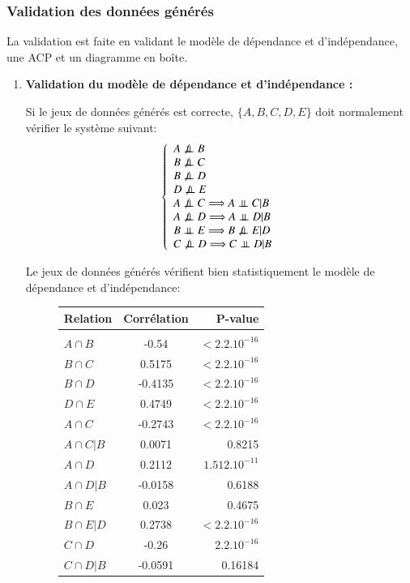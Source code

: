 \documentclass[a4paper]{article}
\begin{document}
\subsubsection{Validation des données générés}
La validation est faite en validant le modèle de dépendance et d'indépendance, une ACP et un diagramme en boîte.
\begin{enumerate}
\item \textbf{ Validation du modèle de dépendance et d'indépendance :}

Si le jeux de données générés est correcte, $\{A,B,C,D,E\}$ doit normalement vérifier le système suivant:
\[
\left\lbrace 
\begin{array}{lcl}
A \not\ci B \\
B \not\ci C\\
B \not\ci D\\
D \not\ci E\\
A\not\ci C \Longrightarrow A\ci C|B\\
A\not\ci D \Longrightarrow A\ci D|B \\
B \ci E \Longrightarrow B\not\ci E|D \\
C\not\ci D \Longrightarrow C\ci D|B\\
\end{array}\right.
\]


Le jeux de données générés vérifient bien statistiquement le modèle de dépendance et d'indépendance:


\begin{figure}[H]
\begin{center}
\begin{tabular}{|l|c|r|}
  \hline
  Relation & Corrélation & P-value \\
  \hline
  
\hline \hline \\
$A\cap B$&-0.54&$<2.2.10^{-16}$\\
$B\cap C$&0.5175&$<2.2.10^{-16}$\\
$B\cap D$&-0.4135&$<2.2.10^{-16}$\\
$D\cap E$&0.4749&$<2.2.10^{-16}$\\
 \hline \hline 
$A\cap C$&-0.2743&$<2.2.10^{-16}$\\
$A\cap C|B$&0.0071&0.8215\\
 \hline \hline 
$A\cap D$&0.2112&$1.512.10^{-11}$\\
$A\cap D|B$&-0.0158 &0.6188\\
 \hline \hline 
$B\cap E$&0.023&0.4675\\
$B\cap E|D$&0.2738&$<2.2.10^{-16}$\\
 \hline \hline 
$C\cap D$&-0.26&$2.2.10^{-16}$\\
$C\cap D|B$&-0.0591&0.16184\\


\end{tabular}
\end{center}
\end{figure}
\end{enumerate}
\end{document}
